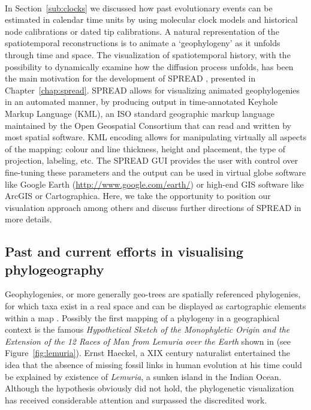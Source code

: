 \paragraph{}
In Section~\ref{sub:clocks} we discussed how past evolutionary events can be estimated in calendar time units by using molecular clock models and historical node calibrations or dated tip calibrations.
A natural representation of the spatiotemporal reconstructions is to animate a `geophylogeny' as it unfolds through time and space.
The visualization of spatiotemporal history, with the possibility to dynamically examine how the diffusion process unfolds, has been the main motivation for the development of SPREAD \citep{Bielejec2011}, presented in Chapter~\ref{chap:spread}.
SPREAD allows for visualizing animated geophylogenies in an automated manner, by producing output in time-annotated Keyhole Markup Language (KML), an ISO standard geographic markup language maintained by the Open Geospatial Consortium that can read and written by most spatial software. 
KML encoding allows for manipulating virtually all aspects of the mapping: colour and line thickness, height and placement, the type of projection, labeling, etc.
The SPREAD GUI provides the user with control over fine-tuning these parameters and the output can be used in virtual globe software like Google Earth (\url{http://www.google.com/earth/}) or high-end GIS software like ArcGIS or Cartographica.
Here, we take the opportunity to position our visualation approach among others and discuss further directions of SPREAD in more details.

\subsection{Past and current efforts in visualising phylogeography}

Geophylogenies, or more generally geo-trees are spatially referenced phylogenies, for which taxa exist in a real space and can be displayed as cartographic elements within a map \citep{Kidd2010}.   
Possibly the first 
mapping of a phylogeny in a geographical context 
is the famous \textit{Hypothetical Sketch of the Monophyletic Origin and the Extension of the 12 Races of Man from Lemuria over the Earth} shown in \cite{Haeckel1876} (see Figure~\ref{fig:lemuria}).
Ernst Haeckel, a XIX century naturalist entertained the idea that the absence of missing fossil links in human evolution at his time could be explained by existence of \textit{Lemuria}, a sunken island in the Indian Ocean.  
Although the hypothesis obviously did not hold, the phylogenetic visualization has received considerable attention and surpassed the discredited work.

